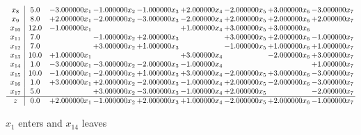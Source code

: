 \documentclass[10pt]{article}
\begin{document}
\[\begin{array}{c| c c@{\hskip 2pt} c@{\hskip 2pt} c@{\hskip 2pt} c@{\hskip 2pt} c@{\hskip 2pt} c@{\hskip 2pt} c@{\hskip 2pt} }
 x_{8}   &  5.0 & -3.000000 x_{1} & -1.000000 x_{2} & -1.000000 x_{3} & + 2.000000 x_{4} & -2.000000 x_{5} & + 3.000000 x_{6} & -3.000000 x_{7}\\
 x_{9}   &  8.0 & + 2.000000 x_{1} & -2.000000 x_{2} & -3.000000 x_{3} & -2.000000 x_{4} & + 2.000000 x_{5} & + 2.000000 x_{6} & + 2.000000 x_{7}\\
 x_{10}   &  12.0 & -1.000000 x_{1} &    &   & + 1.000000 x_{4} & + 3.000000 x_{5} & + 3.000000 x_{6} &   \\
 x_{11}   &  7.0  &   & -1.000000 x_{2} & + 2.000000 x_{3} &   & + 3.000000 x_{5} & + 2.000000 x_{6} & -1.000000 x_{7}\\
 x_{12}   &  7.0  &   & + 3.000000 x_{2} & + 1.000000 x_{3} &   & -1.000000 x_{5} & + 1.000000 x_{6} & + 1.000000 x_{7}\\
 x_{13}   &  10.0 & + 1.000000 x_{1} &    &   & + 3.000000 x_{4} &   & -2.000000 x_{6} & + 3.000000 x_{7}\\
 x_{14}   &  1.0 & -3.000000 x_{1} & -3.000000 x_{2} & -2.000000 x_{3} & -1.000000 x_{4} &    &   & + 1.000000 x_{7}\\
 x_{15}   &  10.0 & -1.000000 x_{1} & -2.000000 x_{2} & + 1.000000 x_{3} & + 3.000000 x_{4} & -2.000000 x_{5} & + 3.000000 x_{6} & -3.000000 x_{7}\\
 x_{16}   &  1.0 & + 3.000000 x_{1} & + 2.000000 x_{2} & -2.000000 x_{3} & -1.000000 x_{4} & + 2.000000 x_{5} & -2.000000 x_{6} & -3.000000 x_{7}\\
 x_{17}   &  5.0  &   & + 3.000000 x_{2} & -3.000000 x_{3} & -1.000000 x_{4} & + 2.000000 x_{5} &   & -2.000000 x_{7}\\
\hline
z    &  0.0 & + 2.000000 x_{1} & -1.000000 x_{2} & + 2.000000 x_{3} & + 1.000000 x_{4} & -2.000000 x_{5} & + 2.000000 x_{6} & -1.000000 x_{7}\\
\end{array}\]


 $ x_{1} $ enters and $ x_{14} $ leaves 
\end{document}

